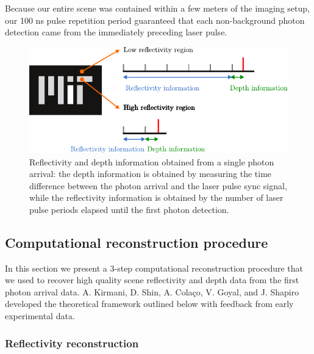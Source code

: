 Because our entire scene was contained within a few meters of the imaging setup, our 100 ns pulse repetition period guaranteed that each non-background photon detection came from the immediately preceding laser pulse.

\begin{figure}[htb]
\centerline{\includegraphics[width=14cm]{figure-first-pulses.pdf}}
\caption{Reflectivity and depth information obtained from a single photon arrival: the depth information is obtained by measuring the time difference between the photon arrival and the laser pulse sync signal, while the reflectivity information is obtained by the number of laser pulse periods elapsed until the first photon detection.}
\label{figure:first-pulses}
\end{figure}

\subsection{Computational reconstruction procedure}

In this section we present a 3-step computational reconstruction procedure that we used to recover high quality scene reflectivity and depth data from the first photon arrival data. A. Kirmani, D. Shin, A. Cola\c{c}o, V. Goyal, and J. Shapiro developed the theoretical framework outlined below \cite{kirmani-first,kirmani-photon} with feedback from early experimental data.

\subsubsection{Reflectivity reconstruction}

